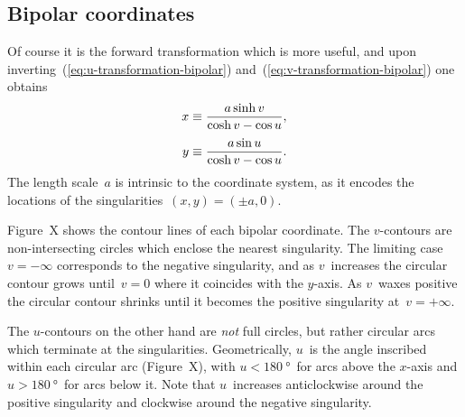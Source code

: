\subsection{Bipolar coordinates}
\label{sec:bipolar.known.coordinates}

Of course it is the forward transformation which is more useful,
and upon inverting~(\ref{eq:u-transformation-bipolar})
and~(\ref{eq:v-transformation-bipolar})
one obtains
\begin{align}
  x &\ideq \frac{a \sinh v}{\cosh v - \cos u},
    \label{eq:x-transformation-bipolar}
    \\[\tallspace]
  y &\ideq \frac{a \sin u}{\cosh v - \cos u}.
    \label{eq:y-transformation-bipolar}
\end{align}
The length scale~$a$ is intrinsic to the coordinate system,
as it encodes the locations of the singularities~$(x, y) = (\pm a, 0)$.

Figure~X shows the contour lines %
of each bipolar coordinate.
The $v$-contours are non-intersecting circles
which enclose the nearest singularity.
The limiting case~$v = -\infty$ corresponds to the negative singularity,
and as $v$~increases the circular contour grows until~$v = 0$
where it coincides with the $y$-axis.
As $v$~waxes positive the circular contour shrinks
until it becomes the positive singularity at~$v = +\infty$.

The $u$-contours on the other hand are \emph{not} full circles,
but rather circular arcs which terminate at the singularities.
Geometrically, $u$~is the angle inscribed within each circular arc
(Figure~X), %
with $u < \SI{180}{\degree}$~for arcs above the $x$-axis
and $u > \SI{180}{\degree}$~for arcs below it.
Note that $u$~increases anticlockwise around the positive singularity
and clockwise around the negative singularity.

